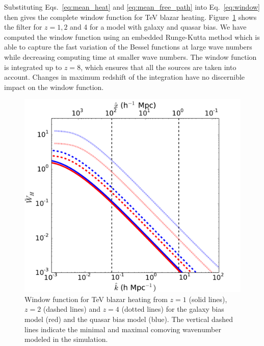 \documentclass[numberedappendix]{emulateapj}
\begin{document}
Substituting Eqs.~\eqref{eq:mean_heat} and \eqref{eq:mean_free_path} into Eq.~\eqref{eq:window} then gives the complete window function for TeV blazar heating. Figure~\ref{fig:window} shows the filter for $z=1,2$ and 4 for a model with galaxy and quasar bias. We have computed the window function using an embedded Runge-Kutta method which is able to capture the fast variation of the Bessel functions at large wave numbers while decreasing computing time at smaller wave numbers. The window function is integrated up to $z=8$, which ensures that all the sources are taken into account. Changes in maximum redshift of the integration have no discernible impact on the window function.

\begin{figure}[h]
\centering
 \includegraphics[width = .45\textwidth ]{window_gal_qso}

\caption{Window function for TeV blazar heating from $z=1$ (solid lines), $z=2$ (dashed lines) and $z=4$ (dotted lines) for the galaxy bias model (red) and the quasar bias model (blue).  The vertical dashed lines indicate the minimal and maximal comoving wavenumber modeled in the simulation. }
\label{fig:window}
\end{figure}
\end{document}
